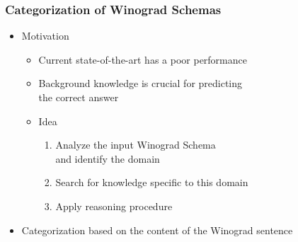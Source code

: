 \documentclass[c,8pt,xcolor...,x11names]{beamer}
\begin{document}
\begin{frame}[fragile]
\frametitle{Categorization of Winograd Schemas}

	\begin{itemize}		
	\normalsize
	\item Motivation
	\begin{itemize}
		\normalsize
		\item Current state-of-the-art has a poor performance
		\item Background knowledge is crucial for predicting\\ the correct answer 
		\onslide<2->			\item Idea
		\onslide<2->		\begin{enumerate}
			\normalsize 
			\item Analyze the input Winograd Schema \\and identify the domain
			\item Search for knowledge \alert{specific} to this domain
			\item Apply reasoning procedure 
		
		\end{enumerate}
	\end{itemize}
	\item  Categorization based on the \alert{content} of the Winograd sentence
\end{itemize}   
\end{frame}
\end{document}
